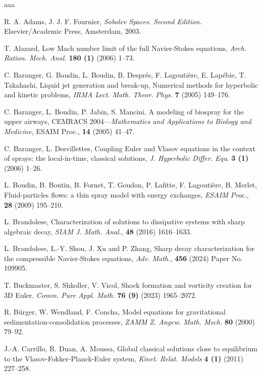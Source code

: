 \documentclass[reqno,11pt]{amsart}
\theoremstyle{plain}
\numberwithin{equation}{section}
\begin{document}

\begin{thebibliography}{aaa}

 R. A. Adams, J. J. F. Fournier,
{\it Sobolev Spaces. Second Edition.} Elsevier/Academic Press, Amsterdam, 2003.
 
T. Alazard,  
Low Mach number limit of the full Navier-Stokes equations,
{\it Arch. Ration. Mech. Anal.} {\bf 180 (1)} (2006)  1--73. 

 C. Baranger, G. Baudin, L. Boudin, 
B. Despr\'{e}s, F. Lagouti\`{e}re, E. Lapébie, T. Takahashi,
Liquid jet generation and break-up, 
Numerical methods for hyperbolic and kinetic problems, 
{\it IRMA Lect. Math. Theor. Phys.} {\bf 7} (2005) 149--176.

 C. Baranger, L. Boudin, P. Jabin, S. Mancini,
A modeling of biospray for the upper airways, CEMRACS 2004---{\it Mathematics and Applications 
to Biology and Medicine}, ESAIM Proc.,  \textbf{14} (2005)  41--47. 

 C. Baranger, L. Desvillettes, 
Coupling Euler and Vlasov equations in the context of sprays: the local-in-time, classical solutions,
{\it J. Hyperbolic Differ. Equ}.  {\bf 3 (1)} (2006) 1--26.

 L. Boudin, B. Boutin, B. Fornet, T. Goudon,
P. Lafitte, F. Lagoutière, B. Merlet, 
Fluid-particles flows: a thin spray model
with energy exchanges, {\it ESAIM Proc.}, {\bf 28} (2009) 195--210.

 L. Brandolese, Characterization of solutions to dissipative systems with sharp 
algebraic decay,   {\it SIAM J. Math. Anal.}, {\bf{48}}  (2016) 1616--1633.

 L. Brandolese, L.-Y. Shou, J. Xu and P. Zhang, Sharp decay characterization 
for the compressible Navier-Stokes equations, \textit{Adv. Math.}, {\bf{456}}  (2024)  Paper No. 109905.


 T. Buckmaster, S. Shkoller, V.  Vicol,  
Shock formation and vorticity creation for 3D Euler.  
\textit{Comm. Pure Appl. Math.} \textbf{76 (9)} (2023)    1965--2072.

 R. B\"{u}rger, W. Wendland, F. Concha, 
Model equations for gravitational 
sedimentation-consolidation processes, {\it ZAMM Z. Angew. Math. Mech.} {\bf 80} (2000) 79--92.

 J.-A. Carrillo, R. Duan, A. Moussa, Global classical solutions close to equilibrium 
to the Vlasov-Fokker-Planck-Euler system, {\it Kinet. Relat. Models} {\bf 4 (1)} (2011) 227--258.


\end{thebibliography}
\end{document}
